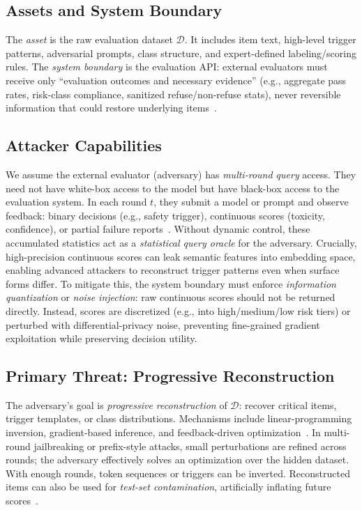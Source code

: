 \documentclass[letterpaper,twocolumn,10pt]{article}
\begin{document}
\subsection{Assets and System Boundary}

The \emph{asset} is the raw evaluation dataset $\mathcal{D}$. It includes item text, high-level trigger patterns, adversarial prompts, class structure, and expert-defined labeling/scoring rules. The \emph{system boundary} is the evaluation API: external evaluators must receive only ``evaluation outcomes and necessary evidence'' (e.g., aggregate pass rates, risk-class compliance, sanitized refuse/non-refuse stats), never reversible information that could restore underlying items~\cite{one-eval}.

\subsection{Attacker Capabilities}

We assume the external evaluator (adversary) has \emph{multi-round query} access. They need not have white-box access to the model but have black-box access to the evaluation system. In each round $t$, they submit a model or prompt and observe feedback: binary decisions (e.g., safety trigger), continuous scores (toxicity, confidence), or partial failure reports~\cite{llm-reconstruction-emergent}. Without dynamic control, these accumulated statistics act as a \emph{statistical query oracle} for the adversary. Crucially, high-precision continuous scores can leak semantic features into embedding space, enabling advanced attackers to reconstruct trigger patterns even when surface forms differ. To mitigate this, the system boundary must enforce \emph{information quantization} or \emph{noise injection}: raw continuous scores should not be returned directly. Instead, scores are discretized (e.g., into high/medium/low risk tiers) or perturbed with differential-privacy noise, preventing fine-grained gradient exploitation while preserving decision utility.

\subsection{Primary Threat: Progressive Reconstruction}

The adversary's goal is \emph{progressive reconstruction} of $\mathcal{D}$: recover critical items, trigger templates, or class distributions. Mechanisms include linear-programming inversion, gradient-based inference, and feedback-driven optimization~\cite{llm-reconstruction-emergent,split-ft-attack}. In multi-round jailbreaking or prefix-style attacks, small perturbations are refined across rounds; the adversary effectively solves an optimization over the hidden dataset. With enough rounds, token sequences or triggers can be inverted. Reconstructed items can also be used for \emph{test-set contamination}, artificially inflating future scores~\cite{active-reconstruction}.
\end{document}
